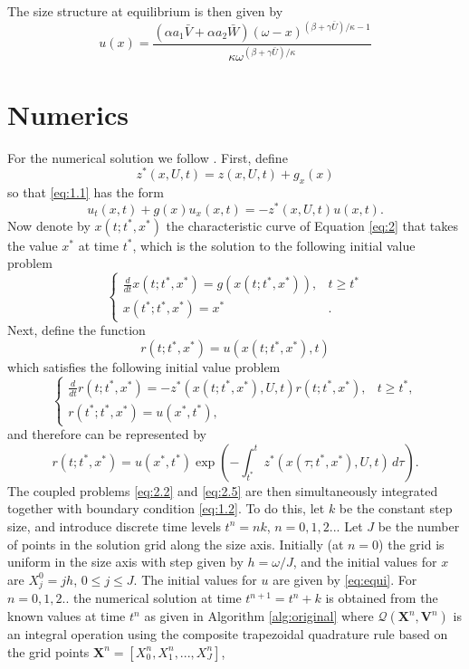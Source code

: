 \documentclass{article}
\begin{document}
The size structure at equilibrium is then given by
\begin{equation}\label{eq:equi}
  u(x)  = \frac{\left(\alpha a_1 \bar{V} + \alpha a_2 \bar{W}\right) (\omega-x)^{(\beta+\gamma\bar{U})/\kappa-1}}{\kappa \omega^{(\beta+\gamma\bar{U})/\kappa}}
\end{equation}

\section{Numerics}
For the numerical solution we follow \cite{Angulo2004}. First, define
\begin{equation}
  z^*(x,U,t)=z(x,U,t)+g_x(x)
\end{equation}
so that \ref{eq:1.1} has the form
\begin{equation}\label{eq:2}
  u_t(x,t) + g(x)u_x(x,t) = -z^*(x,U,t)u(x,t).
\end{equation}
Now denote by $x(t;t^*,x^*)$ the characteristic curve of Equation \ref{eq:2} that takes the value $x^*$ at time $t^*$, which is the solution to the following initial value problem
\begin{equation}\label{eq:2.2}
  \begin{cases}
    \frac{d}{dt} x(t;t^*,x^*)=g(x(t;t^*,x^*)), & t\geq t^*\\
    x(t^*;t^*,x^*)=x^* &. 
  \end{cases}
\end{equation}
Next, define the function
\begin{equation}
  r(t;t^*,x^*)=u(x(t;t^*,x^*),t)
\end{equation}
which satisfies the following initial value problem
\begin{equation}
  \begin{cases}
    \frac{d}{dt} r(t;t^*,x^*)=-z^*(x(t;t^*,x^*),U,t)r(t;t^*,x^*), & t\geq t^*,\\
    r(t^*;t^*,x^*) = u(x^*,t^*), &
  \end{cases}
\end{equation}
and therefore can be represented by 
\begin{equation}\label{eq:2.5}
  r(t;t^*,x^*)=u(x^*,t^*)\exp\left(-\int_{t^*}^{t}z^*(x(\tau;t^*,x^*),U,t)\,d\tau\right).
\end{equation}
The coupled problems \ref{eq:2.2} and \ref{eq:2.5} are then simultaneously integrated together with boundary condition \ref{eq:1.2}. To do this, let $k$ be the constant step size, and introduce discrete time levels $t^n = nk$, $n=0,1,2..$. Let $J$ be the number of points in the solution grid along the size axis. Initially (at $n=0$) the grid is uniform in the size axis with step given by $h=\omega / J$, and the initial values for $x$ are $X_j^0 = jh$, $0\leq j\leq J$. The initial values for $u$ are given by \ref{eq:equi}. For $n=0,1,2..$ the numerical solution at time $t^{n+1}=t^n+k$ is obtained from the known values at time $t^n$ as given in Algorithm \ref{alg:original} where $\mathcal{Q}(\mathbf{X}^n,\mathbf{V}^n)$ is an integral operation using the composite trapezoidal quadrature rule based on the grid points $\mathbf{X}^n = [X_0^n,X_1^n,...,X_J^n]$,
\end{document}
